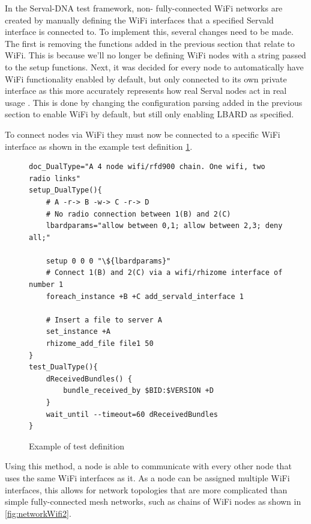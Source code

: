 In the Serval-DNA test framework, non- fully-connected WiFi networks are created by manually defining the WiFi interfaces that a specified Servald interface is connected to.
To implement this, several changes need to be made.
The first is removing the functions added in the previous section that relate to WiFi.
This is because we'll no longer be defining WiFi nodes with a string passed to the setup functions.
Next, it was decided for every node to automatically have WiFi functionality enabled by default, but only connected to its own private interface as this more accurately represents how real Serval nodes act in real usage .
This is done by changing the configuration parsing added in the previous section to enable WiFi by default, but still only enabling LBARD as specified.

To connect nodes via WiFi they must now be connected to a specific WiFi interface as shown in the example test definition \figurename{ \ref{fig:definingInterfaces}}.


\lstset{language=bash,
showstringspaces=false,
numbers=left,
}

\begin{figure}
    \begin{centering}
        \begin{lstlisting}[breaklines, frame=single]
doc_DualType="A 4 node wifi/rfd900 chain. One wifi, two radio links"
setup_DualType(){
    # A -r-> B -w-> C -r-> D
    # No radio connection between 1(B) and 2(C)
    lbardparams="allow between 0,1; allow between 2,3; deny all;"

    setup 0 0 0 "\${lbardparams}"
    # Connect 1(B) and 2(C) via a wifi/rhizome interface of number 1
    foreach_instance +B +C add_servald_interface 1

    # Insert a file to server A
    set_instance +A
    rhizome_add_file file1 50
}
test_DualType(){
    dReceivedBundles() {
        bundle_received_by $BID:$VERSION +D
    }
    wait_until --timeout=60 dReceivedBundles
}
        \end{lstlisting}
        \caption{Example of test definition}
        \label{fig:definingInterfaces}
    \end{centering}
\end{figure}

Using this method, a node is able to communicate with every other node that uses the same WiFi interfaces as it.
As a node can be assigned multiple WiFi interfaces, this allows for network topologies that are more complicated than simple fully-connected mesh networks, such as chains of WiFi nodes as shown in \figurename{ \ref{fig:networkWifi2}}.

